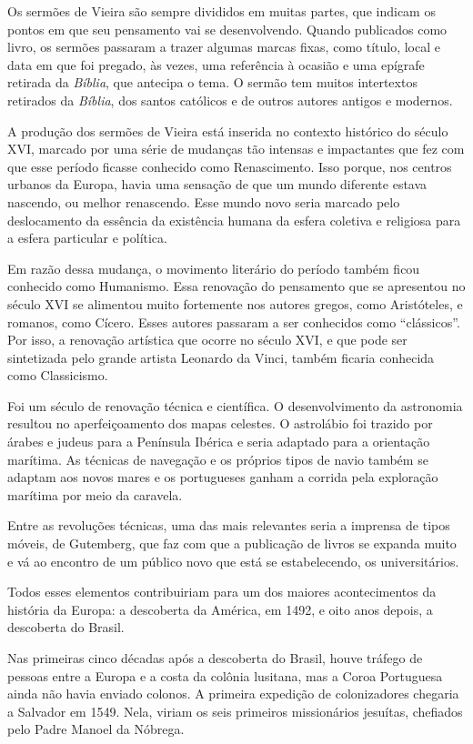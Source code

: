 Os sermões de Vieira são sempre divididos em muitas partes, que indicam
os pontos em que seu pensamento vai se desenvolvendo. Quando publicados
como livro, os sermões passaram a trazer algumas marcas fixas, como
título, local e data em que foi pregado, às vezes, uma referência à
ocasião e uma epígrafe retirada da \emph{Bíblia}, que antecipa o tema. O
sermão tem muitos intertextos retirados da \emph{Bíblia}, dos santos
católicos e de outros autores antigos e modernos.

A produção dos sermões de Vieira está inserida no contexto histórico 
do século XVI, marcado por uma série de mudanças tão intensas e
impactantes que fez com que esse período ficasse conhecido como
Renascimento. Isso porque, nos centros urbanos da Europa, havia uma
sensação de que um mundo diferente estava nascendo, ou melhor
renascendo. Esse mundo novo seria marcado pelo deslocamento da essência
da existência humana da esfera coletiva e religiosa para a esfera
particular e política.

Em razão dessa mudança, o movimento literário do período também ficou
conhecido como Humanismo. Essa renovação do pensamento que se apresentou
no século XVI se alimentou muito fortemente nos autores gregos, como
Aristóteles, e romanos, como Cícero. Esses autores passaram a ser
conhecidos como ``clássicos''. Por isso, a renovação artística que
ocorre no século XVI, e que pode ser sintetizada pelo grande artista
Leonardo da Vinci, também ficaria conhecida como Classicismo.

Foi um século de renovação técnica e científica. O desenvolvimento da
astronomia resultou no aperfeiçoamento dos mapas celestes. O astrolábio
foi trazido por árabes e judeus para a Península Ibérica e seria
adaptado para a orientação marítima. As técnicas de navegação e os
próprios tipos de navio também se adaptam aos novos mares e os
portugueses ganham a corrida pela exploração marítima por meio da
caravela.

Entre as revoluções técnicas, uma das mais relevantes seria a imprensa
de tipos móveis, de Gutemberg, que faz com que a publicação de livros se
expanda muito e vá ao encontro de um público novo que está se
estabelecendo, os universitários.

Todos esses elementos contribuiriam para um dos maiores acontecimentos
da história da Europa: a descoberta da América, em 1492, e oito anos
depois, a descoberta do Brasil.

Nas primeiras cinco décadas após a descoberta do Brasil, houve tráfego
de pessoas entre a Europa e a costa da colônia lusitana, mas a Coroa
Portuguesa ainda não havia enviado colonos. A primeira expedição de
colonizadores chegaria a Salvador em 1549. Nela, viriam os seis
primeiros missionários jesuítas, chefiados pelo Padre Manoel da Nóbrega.

